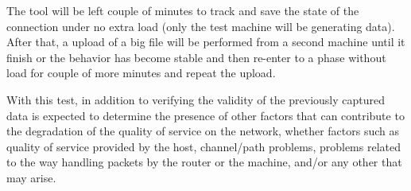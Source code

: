 The tool will be left couple of minutes to track and save the state of the
connection under no extra load (only the test machine will be generating
data). After that, a upload of a big file will be performed from a second
machine until it finish or the behavior has become stable and then re-enter to
a phase without load for couple of more minutes and repeat the upload.

With this test, in addition to verifying the validity of the previously captured
data is expected to determine the presence of other factors that can contribute
to the degradation of the quality of service on the network, whether factors
such as quality of service provided by the host, channel/path problems, problems
related to the way handling packets by the router or the machine, and/or any
other that may arise.
